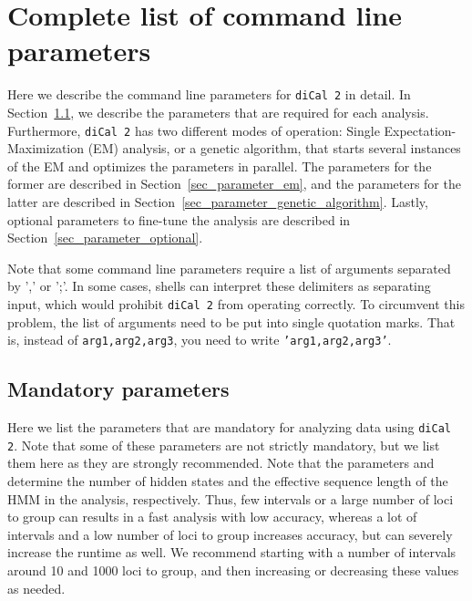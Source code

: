 \documentclass{article}
\numberwithin{equation}{section}
\begin{document}
\section{Complete list of command line parameters}
\label{sec_command_line}

Here we describe the command line parameters for \texttt{diCal 2} in detail. In Section~\ref{sec_parameter_mandatory}, we describe the parameters that are required for each analysis. Furthermore, \texttt{diCal 2} has two different modes of operation: Single Expectation-Maximization (EM) analysis, or a genetic algorithm, that starts several instances of the EM and optimizes the parameters in parallel. The parameters for the former are described in Section~\ref{sec_parameter_em}, and the parameters for the latter are described in Section~\ref{sec_parameter_genetic_algorithm}. Lastly, optional parameters to fine-tune the analysis are described in Section~\ref{sec_parameter_optional}.

Note that some command line parameters require a list of arguments separated by ',' or ';'. In some cases, shells can interpret these delimiters as separating input, which would prohibit \texttt{diCal 2} from operating correctly. To circumvent this problem, the list of arguments need to be put into single quotation marks. That is, instead of \texttt{arg1,arg2,arg3}, you need to write \texttt{'arg1,arg2,arg3'}.

\subsection{Mandatory parameters}
\label{sec_parameter_mandatory}

Here we list the parameters that are mandatory for analyzing data using \texttt{diCal 2}. Note that some of these parameters are not strictly mandatory, but we list them here as they are strongly recommended. Note that the parameters  and  determine the number of hidden states and the effective sequence length of the HMM in the analysis, respectively. Thus, few intervals or a large number of loci to group can results in a fast analysis with low accuracy, whereas a lot of intervals and a low number of loci to group increases accuracy, but can severely increase the runtime as well. We recommend starting with a number of intervals around 10 and 1000 loci to group, and then increasing or decreasing these values as needed.
\end{document}
